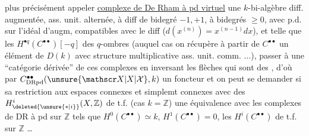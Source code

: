 plus précisément appeler \uline{complexe de De Rham à pd virtuel}  une  $k$-bi-algèbre diff. augmentée, ass. unit. alternée, à diff de bidegré $-1,+1$,  à bidegrés $\geq 0$, avec p.d. sur l'idéal d'augm, compatibles avec le diff ($d(x^{(n)})=x^{(n-1)}dx$), et telle que les $H^{\bullet q}(C^{\bullet\bullet})[-q]$  des $q$-ombres \unsure{$\simeq$|$\sim$} (auquel cas on récupère à partir de $C^{\bullet\bullet}$ un élément de $D(k)$ avec structure multiplicative ass. unit. comm. $\ldots$), passer à une ``catégorie dérivée'' de ces complexes en inversant les flèches qui sont des , d'où par $C^{\bullet\bullet}_{\mathrm{DRpd}}(\unsure{\mathscr X|X|\mathcal X},k)$ un foncteur
et on peut se demander si sa restriction aux espaces connexes et simplemt connexes avec des $H_{\deleted{\unsure{\ast|i}}}^{i}(X,\mathbb Z)$ de t.f. (cas $k=\mathbb Z$)   une équivalence avec les complexes de DR à pd sur $\mathbb Z$ tels que $H^0(C^{\bullet\bullet})\simeq k$, $H^1(C^{\bullet\bullet})=0$, les $H^i(C^{\bullet\bullet})$ de t.f. sur $\mathbb Z$ \ldots

